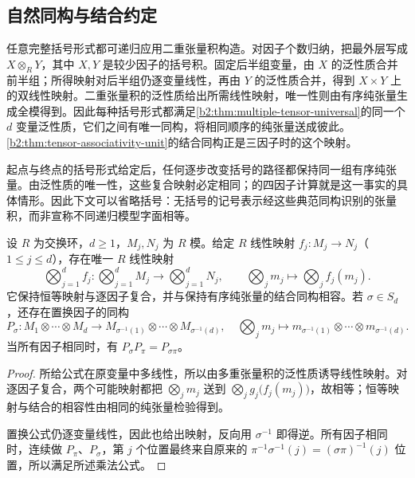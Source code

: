 \subsection{自然同构与结合约定}
\label{b2:subsec:0801:02}

任意完整括号形式都可递归应用二重张量积构造。对因子个数归纳，把最外层写成 \(X\otimes_RY\)，其中 \(X,Y\) 是较少因子的括号积。固定后半组变量，由 \(X\) 的泛性质合并前半组；所得映射对后半组仍逐变量线性，再由 \(Y\) 的泛性质合并，得到 \(X\times Y\) 上的双线性映射。二重张量积的泛性质给出所需线性映射，唯一性则由有序纯张量生成全模得到。因此每种括号形式都满足\cref{b2:thm:multiple-tensor-universal}的同一个 \(d\) 变量泛性质，它们之间有唯一同构，将相同顺序的纯张量送成彼此。\cref{b2:thm:tensor-associativity-unit}的结合同构正是三因子时的这个映射。

\ProseParagraphBreak
起点与终点的括号形式给定后，任何逐步改变括号的路径都保持同一组有序纯张量。由泛性质的唯一性，这些复合映射必定相同；的四因子计算就是这一事实的具体情形。因此下文可以省略括号：无括号的记号表示经这些典范同构识别的张量积，而非宣称不同递归模型字面相等。

\begin{proposition}\label{b2:prop:multiple-tensor-functoriality}
	设 \(R\) 为交换环，\(d\ge1\)，\(M_j,N_j\) 为 \(R\) 模。给定 \(R\) 线性映射 \(f_j:M_j\rightarrow N_j\)（\(1\le j\le d\)），存在唯一 \(R\) 线性映射
	\[
		\bigotimes_{j=1}^d f_j:\bigotimes_{j=1}^d M_j\longrightarrow\bigotimes_{j=1}^d N_j, \qquad \bigotimes_jm_j\longmapsto\bigotimes_j f_j(m_j).
	\]
	它保持恒等映射与逐因子复合，并与保持有序纯张量的结合同构相容。若 \(\sigma\in S_d\)，还存在置换因子的同构
	\[
		P_\sigma:M_1\otimes\cdots\otimes M_d \longrightarrow M_{\sigma^{-1}(1)}\otimes\cdots\otimes M_{\sigma^{-1}(d)}, \quad \bigotimes_jm_j\longmapsto m_{\sigma^{-1}(1)}\otimes\cdots\otimes m_{\sigma^{-1}(d)}.
	\]
	当所有因子相同时，有 \(P_\sigma P_\pi=P_{\sigma\pi}\)。
\end{proposition}
\begin{proof}
	所给公式在原变量中多线性，所以由多重张量积的泛性质诱导线性映射。对逐因子复合，两个可能映射都把 \(\bigotimes_jm_j\) 送到 \(\bigotimes_j g_j\bigl(f_j(m_j)\bigr)\)，故相等；恒等映射与结合的相容性由相同的纯张量检验得到。

	置换公式仍逐变量线性，因此也给出映射，反向用 \(\sigma^{-1}\) 即得逆。所有因子相同时，连续做 \(P_\pi\)、\(P_\sigma\)，第 \(j\) 个位置最终来自原来的 \(\pi^{-1}\sigma^{-1}(j)=(\sigma\pi)^{-1}(j)\) 位置，所以满足所述乘法公式。
\end{proof}

